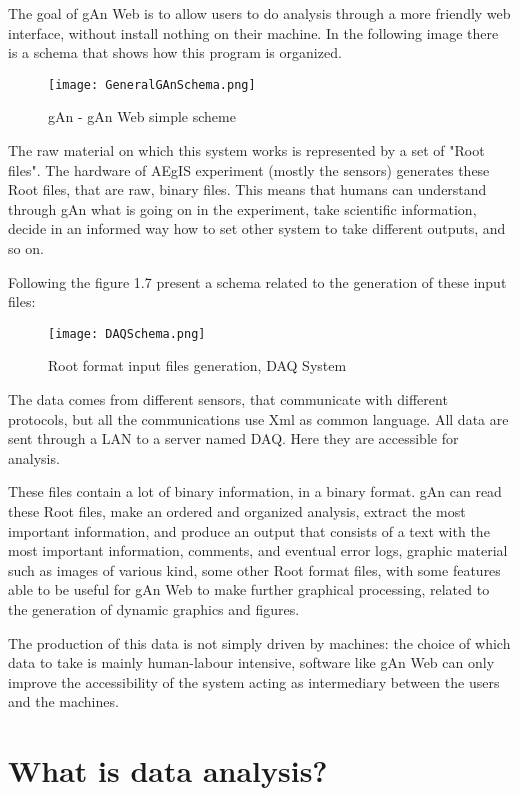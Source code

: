 The goal of gAn Web is to allow users to do analysis through a more friendly web interface, without install nothing on their machine. In the following image there is a schema that shows how this program is organized.

\begin{figure}[H]
\centering
\texttt{[image: GeneralGAnSchema.png]} 
\caption{gAn - gAn Web simple scheme}
\end{figure}





The raw material on which this system works is represented by a set of "Root files". 
The hardware of AEgIS experiment (mostly the sensors) generates these Root files, that are raw, binary files. This means that humans can understand through gAn what is going on in the experiment, take scientific information, decide in an informed way how to set other system to take different outputs, and so on.
 
Following the figure 1.7 present a schema related to the generation of these input files:

\begin{figure}[H]
\centering
\texttt{[image: DAQSchema.png]} 
\caption{Root format input files generation, DAQ System}
\end{figure}

The data comes from different sensors, that communicate with different protocols, but all the communications use Xml as common language. All data are sent through a LAN to a server named DAQ. Here they are accessible for analysis. 

These files contain a lot of binary information, in a binary format. gAn can read these Root files, make an ordered and organized analysis, extract the most important information, and produce an output that consists of a text with the most important information, comments, and eventual error logs, graphic material such as images of various kind, some other Root format files, with some features able to be useful  for gAn Web to make further graphical processing, related to the generation of dynamic graphics and figures. 

The production of this data is not simply driven by machines: the choice of which data to take is mainly human-labour intensive, software like gAn Web can only improve the accessibility of the system acting as intermediary between the users and the machines.


\section{What is data analysis?}

